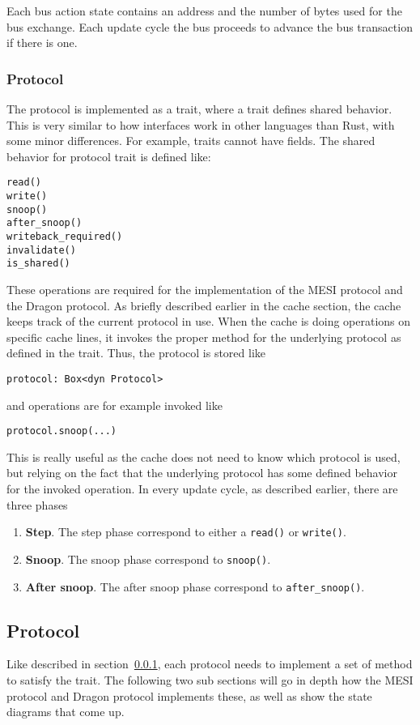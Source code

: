 Each bus action state contains an address and the number of bytes used for the bus exchange.  Each
update cycle the bus proceeds to advance the bus transaction if there is one.

\subsubsection{Protocol}
\label{sec:sub_protocol}
The protocol is implemented as a trait, where a trait defines shared behavior.  This is very
similar to how interfaces work in other languages than Rust, with some minor differences.  For
example, traits cannot have fields.  The shared behavior for protocol trait is defined like:

\begin{lstlisting}
read()
write()
snoop()
after_snoop()
writeback_required()
invalidate()
is_shared()
\end{lstlisting}
These operations are required for the implementation of the MESI protocol and the Dragon protocol.
As briefly described earlier in the cache section, the cache keeps track of the current protocol in
use.  When the cache is doing operations on specific cache lines, it invokes the proper method for
the underlying protocol as defined in the trait.  Thus, the protocol is stored like
\begin{lstlisting}
protocol: Box<dyn Protocol>
\end{lstlisting}
and operations are for example invoked like
\begin{lstlisting}
protocol.snoop(...)
\end{lstlisting}

This is really useful as the cache does not need to know which protocol is used, but relying on the fact that the underlying protocol has some defined behavior for the invoked operation.
In every update cycle, as described earlier, there are three phases

\begin{enumerate}
    \item \textbf{Step}. The step phase correspond to either a \texttt{read()} or \texttt{write()}.
    \item \textbf{Snoop}. The snoop phase correspond to \texttt{snoop()}.
    \item \textbf{After snoop}. The after snoop phase correspond to \texttt{after\_snoop()}.
\end{enumerate}

\subsection{Protocol}
Like described in section~\ref{sec:sub_protocol}, each protocol needs to implement a set of method
to satisfy the trait.  The following two sub sections will go in depth how the MESI protocol and
Dragon protocol implements these, as well as show the state diagrams that come up.

